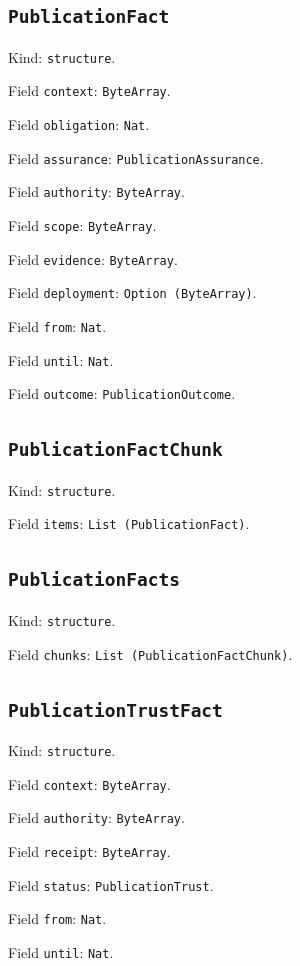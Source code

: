 \documentclass[11pt]{article}
\begin{document}
\subsection*{\texttt{PublicationFact}}
\noindent Kind: \texttt{structure}.\par
\noindent Field \texttt{context}: \texttt{ByteArray}.\par
\noindent Field \texttt{obligation}: \texttt{Nat}.\par
\noindent Field \texttt{assurance}: \texttt{PublicationAssurance}.\par
\noindent Field \texttt{authority}: \texttt{ByteArray}.\par
\noindent Field \texttt{scope}: \texttt{ByteArray}.\par
\noindent Field \texttt{evidence}: \texttt{ByteArray}.\par
\noindent Field \texttt{deployment}: \texttt{Option (ByteArray)}.\par
\noindent Field \texttt{from}: \texttt{Nat}.\par
\noindent Field \texttt{until}: \texttt{Nat}.\par
\noindent Field \texttt{outcome}: \texttt{PublicationOutcome}.\par
\subsection*{\texttt{PublicationFactChunk}}
\noindent Kind: \texttt{structure}.\par
\noindent Field \texttt{items}: \texttt{List (PublicationFact)}.\par
\subsection*{\texttt{PublicationFacts}}
\noindent Kind: \texttt{structure}.\par
\noindent Field \texttt{chunks}: \texttt{List (PublicationFactChunk)}.\par
\subsection*{\texttt{PublicationTrustFact}}
\noindent Kind: \texttt{structure}.\par
\noindent Field \texttt{context}: \texttt{ByteArray}.\par
\noindent Field \texttt{authority}: \texttt{ByteArray}.\par
\noindent Field \texttt{receipt}: \texttt{ByteArray}.\par
\noindent Field \texttt{status}: \texttt{PublicationTrust}.\par
\noindent Field \texttt{from}: \texttt{Nat}.\par
\noindent Field \texttt{until}: \texttt{Nat}.\par
\end{document}
